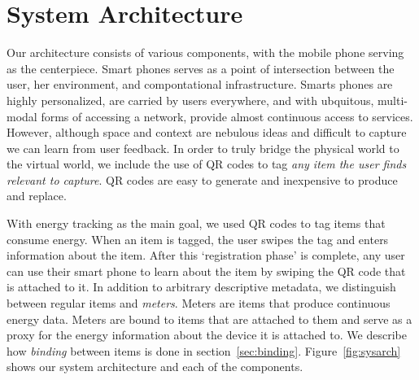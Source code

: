 \section{System Architecture}
Our architecture consists of various components, with the mobile phone serving as the centerpiece.  Smart phones
serves as a point of intersection between the user, her environment, and compontational infrastructure.  Smarts phones
are highly personalized, are carried by users everywhere, and with ubquitous, multi-modal forms of accessing a network,
provide almost continuous access to services.  However, although space and context are nebulous ideas and difficult to capture
we can learn from user feedback.  In order to truly bridge the physical world to the virtual world, we include the use
of QR codes to tag \emph{any item the user finds relevant to capture}.  QR codes are easy to generate and inexpensive
to produce and replace.

With energy tracking as the main goal, we used QR codes to tag items that consume energy.  When an item is tagged, the user swipes
the tag and enters information about the item.  After this `registration phase' is complete, any user can use
their smart phone to learn about the item by swiping the QR code that is attached to it.  In addition to arbitrary
descriptive metadata, we distinguish between regular items and \emph{meters}.  Meters are items that produce
continuous energy data.  Meters are bound to items that are attached to them and serve as a proxy for the energy information
about the device it is attached to.  We describe how \emph{binding} between items is done in section~\ref{sec:binding}.
Figure~\ref{fig:sysarch} shows our system architecture and each of the components.

